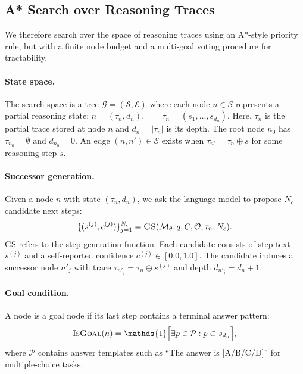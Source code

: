\documentclass{article}
\begin{document}
\subsection{A* Search over Reasoning Traces}
\label{sec:astar}

We therefore search over the space of reasoning traces using an A*-style priority rule, but with a finite node budget and a multi-goal voting procedure for tractability.

\paragraph{State space.}
The search space is a tree $\mathcal{G} = (\mathcal{S}, \mathcal{E})$ where each node $n \in \mathcal{S}$ represents a partial reasoning state: $n = (\tau_n, d_n), \qquad \tau_n = (s_1, \ldots, s_{d_n})$. Here, $\tau_n$ is the partial trace stored at node $n$ and $d_n = |\tau_n|$ is its depth. The root node $n_0$ has $\tau_{n_0} = \emptyset$ and $d_{n_0} = 0$. An edge $(n,n') \in \mathcal{E}$ exists when $\tau_{n'} = \tau_n \oplus s$ for some reasoning step $s$.

\paragraph{Successor generation.}
Given a node $n$ with state $(\tau_n, d_n)$, we ask the language model to propose $N_c$ candidate next steps:
\begin{equation}
\{(s^{(j)}, c^{(j)})\}_{j=1}^{N_c} = \textsc{GS}(\mathcal{M}_\theta, q, C, \mathcal{O}, \tau_n, N_c).
\label{eq:successor}
\end{equation}
\textsc{GS} refers to the step-generation function. Each candidate consists of step text $s^{(j)}$ and a self-reported confidence $c^{(j)} \in [0.0,1.0]$. The candidate induces a successor node $n'_j$ with trace $\tau_{n'_j} = \tau_n \oplus s^{(j)}$ and depth $d_{n'_j} = d_n + 1$.

\paragraph{Goal condition.}
A node is a goal node if its last step contains a terminal answer pattern:
\begin{equation}
\textsc{IsGoal}(n) = \mathds{1}\Big[\exists p \in \mathcal{P}: p \subset s_{d_n}\Big],
\label{eq:isgoal}
\end{equation}
where $\mathcal{P}$ contains answer templates such as ``The answer is [A/B/C/D]'' for multiple-choice tasks.
\end{document}
